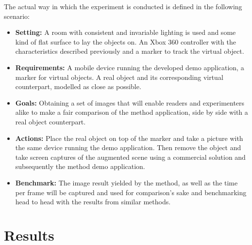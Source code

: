 The actual way in which the experiment is conducted is defined in the following scenario:
\begin{itemize}
    \item \textbf{Setting:} A room with consistent and invariable lighting is used and some kind of flat surface to lay the objects on. An Xbox 360 controller with the characteristics described previously and a marker to track the virtual object.
    \item \textbf{Requirements:} A mobile device running the developed demo application, a marker for virtual objects. A real object and its corresponding virtual counterpart, modelled as close as possible. 
    \item \textbf{Goals:} Obtaining a set of images that will enable readers and experimenters alike to make a fair comparison of the method application, side by side with a real object counterpart.
    \item \textbf{Actions:} Place the real object on top of the marker and take a picture with the same device running the demo application. Then remove the object and take screen captures of the augmented scene using a commercial solution and subsequently the method demo application.
     \item \textbf{Benchmark:} The image result yielded by the method, as well as the  time per frame will be captured and used for comparison's sake and benchmarking head to head with the results from similar methods.
\end{itemize}

\section{Results}

